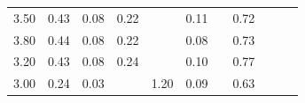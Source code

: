 \begin{refsection}[referencesCh3]
\begin{table}
\begin{adjustbox}{scale=0.8,center}
\begin{tabular}{@{}ccccccccccc@{}}
		3.50                                                         & 0.43                                                & 0.08                                                & 0.22                                                &                                                     & 0.11                                                 &                                                     & 0.72                                                  &                                                         &                                                      & \cite{Tampere}                                                        \\
		3.80                                                         & 0.44                                                & 0.08                                                & 0.22                                                &                                                     & 0.08                                                 &                                                     & 0.73                                                  &                                                         &                                                      & \cite{Tampere}                                                        \\
		3.20                                                         & 0.43                                                & 0.08                                                & 0.24                                                &                                                     & 0.10                                                 &                                                     & 0.77                                                  &                                                         &                                                      & \cite{Tampere}                                                       \\
		3.00                                                         & 0.24                                                & 0.03                                                &                                                     & 1.20                                                & 0.09                                                 &                                                     & 0.63                                                  &                                                         &                                                      & \cite{Loes}                                                                 \\

\end{tabular}
\end{adjustbox}
\end{table}
\end{refsection}
